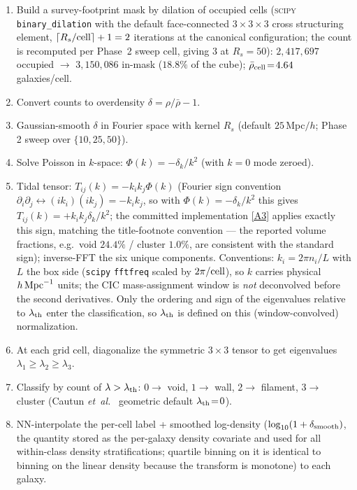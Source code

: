 \documentclass[aps,prd,twocolumn,superscriptaddress,showpacs,preprintnumbers,nofootinbib,longbibliography,floatfix]{revtex4-2}
\newcommand{\repoBase}{https://github.com/Hubify-Projects/bigbounce/blob/main}
\begin{document}
\begin{enumerate}
per-class $f_{\rm CW}$ moves by at most $0.23$~pp (the small wall
class; filament $-0.005$~pp, cluster $+0.013$~pp), leaving every
environment--chirality conclusion unchanged (artifact
\href{\repoBase/pipelines/p5\_desi\_chirality/outputs/23\_unique\_parent\_rebuild.json}{[A4]}).
\item Build a survey-footprint mask by dilation of occupied cells
(\textsc{scipy} \texttt{binary\_dilation} with the default
face-connected $3\!\times\!3\!\times\!3$ cross structuring element,
$\lceil R_s/{\rm cell}\rceil + 1 = 2$ iterations at the canonical
configuration; the count is recomputed per Phase~2 sweep cell,
giving 3 at $R_s\!=\!50$): $2{,}417{,}697$ occupied $\to$ $3{,}150{,}086$ in-mask
($18.8\%$ of the cube); $\bar\rho_{\rm cell}\!=\!4.64$ galaxies/cell.
\item Convert counts to overdensity
$\delta = \rho / \bar\rho - 1$.
\item Gaussian-smooth $\delta$ in Fourier space with kernel $R_s$
(default $25$\,Mpc$/h$; Phase 2 sweep over $\{10, 25, 50\}$).
\item Solve Poisson in $k$-space: $\Phi(k) = -\delta_k / k^2$
(with $k\!=\!0$ mode zeroed).
\item Tidal tensor: $T_{ij}(k) = -k_i k_j \Phi(k)$ (Fourier sign
convention $\partial_i \partial_j \leftrightarrow (ik_i)(ik_j) =
-k_i k_j$, so with $\Phi(k) = -\delta_k/k^2$ this gives
$T_{ij}(k) = +k_i k_j \delta_k / k^2$; the committed implementation
\href{\repoBase/pipelines/p5\_desi\_chirality/env\_finder/01\_compute\_vweb.py}{[A3]} applies exactly this sign,
matching the title-footnote convention --- the reported volume
fractions, e.g.\ void $24.4\%$ / cluster $1.0\%$, are consistent with
the standard sign); inverse-FFT the six
unique components. Conventions: $k_i = 2\pi n_i / L$ with $L$ the box
side (\texttt{scipy} \texttt{fftfreq} scaled by $2\pi/{\rm cell}$),
so $k$ carries physical $h\,{\rm Mpc}^{-1}$ units; the CIC
mass-assignment window is \emph{not} deconvolved before the second
derivatives. Only the ordering and sign of the eigenvalues relative
to $\lambda_{\rm th}$ enter the classification, so $\lambda_{\rm th}$
is defined on this (window-convolved) normalization.
\item At each grid cell, diagonalize the symmetric $3\!\times\!3$
tensor to get eigenvalues
$\lambda_1 \ge \lambda_2 \ge \lambda_3$.
\item Classify by count of $\lambda > \lambda_{\rm th}$:
$0 \to$ void, $1 \to$ wall, $2 \to$ filament, $3 \to$ cluster
(Cautun \textit{et~al.}\ \cite{Cautun2014} geometric default
$\lambda_{\rm th}\!=\!0$).
\item NN-interpolate the per-cell label + smoothed log-density
($\log_{10}(1 + \delta_{\rm smooth})$, the quantity stored as the
per-galaxy density covariate and used for all within-class density
stratifications; quartile binning on it is identical to binning on
the linear density because the transform is monotone) to each
galaxy.
\end{enumerate}
\end{document}
